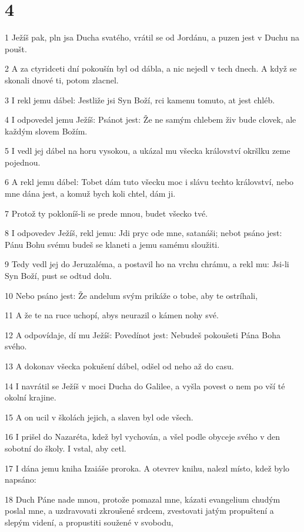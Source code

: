 \chapter{4}

\par 1 Ježíš pak, pln jsa Ducha svatého, vrátil se od Jordánu, a puzen jest v Duchu na poušt.
\par 2 A za ctyridceti dní pokoušín byl od dábla, a nic nejedl v tech dnech. A když se skonali dnové ti, potom zlacnel.
\par 3 I rekl jemu dábel: Jestliže jsi Syn Boží, rci kamenu tomuto, at jest chléb.
\par 4 I odpovedel jemu Ježíš: Psánot jest: Že ne samým chlebem živ bude clovek, ale každým slovem Božím.
\par 5 I vedl jej dábel na horu vysokou, a ukázal mu všecka království okršlku zeme pojednou.
\par 6 A rekl jemu dábel: Tobet dám tuto všecku moc i slávu techto království, nebo mne dána jest, a komuž bych koli chtel, dám ji.
\par 7 Protož ty pokloníš-li se prede mnou, budet všecko tvé.
\par 8 I odpovedev Ježíš, rekl jemu: Jdi pryc ode mne, satanáši; nebot psáno jest: Pánu Bohu svému budeš se klaneti a jemu samému sloužiti.
\par 9 Tedy vedl jej do Jeruzaléma, a postavil ho na vrchu chrámu, a rekl mu: Jsi-li Syn Boží, pust se odtud dolu.
\par 10 Nebo psáno jest: Že andelum svým prikáže o tobe, aby te ostríhali,
\par 11 A že te na ruce uchopí, abys neurazil o kámen nohy své.
\par 12 A odpovídaje, dí mu Ježíš: Povedínot jest: Nebudeš pokoušeti Pána Boha svého.
\par 13 A dokonav všecka pokušení dábel, odšel od neho až do casu.
\par 14 I navrátil se Ježíš v moci Ducha do Galilee, a vyšla povest o nem po vší té okolní krajine.
\par 15 A on ucil v školách jejich, a slaven byl ode všech.
\par 16 I prišel do Nazaréta, kdež byl vychován, a všel podle obyceje svého v den sobotní do školy. I vstal, aby cetl.
\par 17 I dána jemu kniha Izaiáše proroka. A otevrev knihu, nalezl místo, kdež bylo napsáno:
\par 18 Duch Páne nade mnou, protože pomazal mne, kázati evangelium chudým poslal mne, a uzdravovati zkroušené srdcem, zvestovati jatým propuštení a slepým videní, a propustiti soužené v svobodu,
